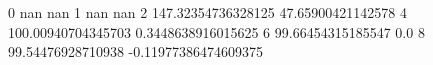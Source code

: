 0 nan nan
1 nan nan
2 147.32354736328125 47.65900421142578
4 100.00940704345703 0.3448638916015625
6 99.66454315185547 0.0
8 99.54476928710938 -0.11977386474609375
